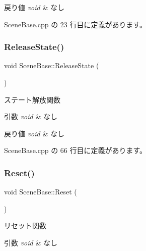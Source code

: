 \begin{DoxyRetVals}{戻り値}
{\em void} & なし \\
\hline
\end{DoxyRetVals}


 Scene\+Base.\+cpp の 23 行目に定義があります。

\mbox{\label{class_scene_base_aaa1e66fbfc6740b069d715b325915b97}} 
\subsubsection{\texorpdfstring{Release\+State()}{ReleaseState()}}
{\footnotesize\ttfamily void Scene\+Base\+::\+Release\+State (\begin{DoxyParamCaption}{ }\end{DoxyParamCaption})}



ステート解放関数 


\begin{DoxyParams}{引数}
{\em void} & なし \\
\hline
\end{DoxyParams}

\begin{DoxyRetVals}{戻り値}
{\em void} & なし \\
\hline
\end{DoxyRetVals}


 Scene\+Base.\+cpp の 66 行目に定義があります。

\mbox{\label{class_scene_base_ae2dc09554ec21ffe231fa73a6cdd7ca1}} 
\subsubsection{\texorpdfstring{Reset()}{Reset()}}
{\footnotesize\ttfamily void Scene\+Base\+::\+Reset (\begin{DoxyParamCaption}{ }\end{DoxyParamCaption})}



リセット関数 


\begin{DoxyParams}{引数}
{\em void} & なし \\
\hline
\end{DoxyParams}

